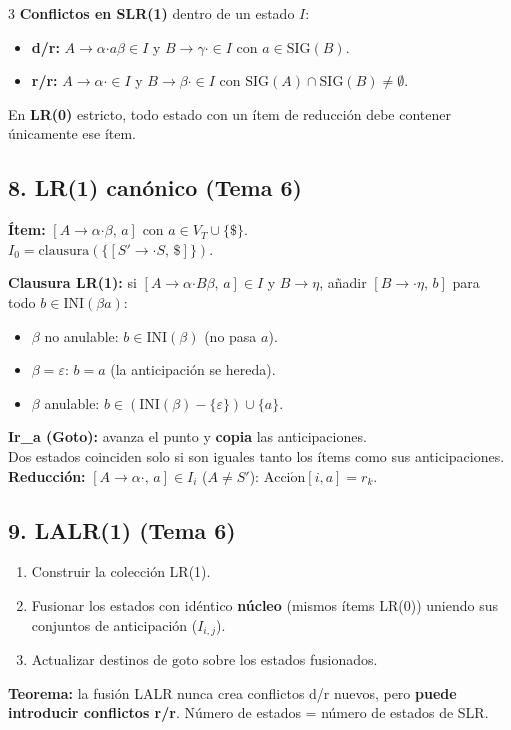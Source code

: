 \begin{landscape}
\begin{multicols*}{3}
\textbf{Conflictos en SLR(1)} dentro de un estado $I$:
\begin{itemize}
\item \textbf{d/r:} $A\to\alpha\mathbin{\boldsymbol{\cdot}} a\beta\in I$ y $B\to\gamma\mathbin{\boldsymbol{\cdot}}\in I$ con $a\in\mathrm{SIG}(B)$.
\item \textbf{r/r:} $A\to\alpha\mathbin{\boldsymbol{\cdot}}\in I$ y $B\to\beta\mathbin{\boldsymbol{\cdot}}\in I$ con $\mathrm{SIG}(A)\cap\mathrm{SIG}(B)\ne\emptyset$.
\end{itemize}
En \textbf{LR(0)} estricto, todo estado con un ítem de reducción debe contener únicamente ese ítem.

\columnbreak

\subsection*{8. LR(1) canónico (Tema 6)}
\textbf{Ítem:} $[A\to\alpha\mathbin{\boldsymbol{\cdot}}\beta,\,a]$ con $a\in V_T\cup\{\$\}$.\\
$I_0=\mathrm{clausura}(\{[S'\to\mathbin{\boldsymbol{\cdot}} S,\,\$]\})$.

\textbf{Clausura LR(1):} si $[A\to\alpha\mathbin{\boldsymbol{\cdot}} B\beta,\,a]\in I$ y $B\to\eta$, añadir $[B\to\mathbin{\boldsymbol{\cdot}}\eta,\,b]$ para todo $b\in\mathrm{INI}(\beta a)$:
\begin{itemize}
\item $\beta$ no anulable: $b\in\mathrm{INI}(\beta)$ (no pasa $a$).
\item $\beta=\varepsilon$: $b=a$ (la anticipación se hereda).
\item $\beta$ anulable: $b\in(\mathrm{INI}(\beta)-\{\varepsilon\})\cup\{a\}$.
\end{itemize}
\textbf{Ir\_a (Goto):} avanza el punto y \textbf{copia} las anticipaciones.\\
Dos estados coinciden solo si son iguales tanto los ítems como sus anticipaciones.\\
\textbf{Reducción:} $[A\to\alpha\mathbin{\boldsymbol{\cdot}},\,a]\in I_i$ ($A\ne S'$): $\mathrm{Acci\acute{o}n}[i,a]=r_k$.

\subsection*{9. LALR(1) (Tema 6)}
\begin{enumerate}
\item Construir la colección LR(1).
\item Fusionar los estados con idéntico \textbf{núcleo} (mismos ítems LR(0)) uniendo sus conjuntos de anticipación ($I_{i,j}$).
\item Actualizar destinos de $\mathrm{goto}$ sobre los estados fusionados.
\end{enumerate}
\textbf{Teorema:} la fusión LALR nunca crea conflictos d/r nuevos, pero \textbf{puede introducir conflictos r/r}. Número de estados = número de estados de SLR.


\end{multicols*}
\end{landscape}
